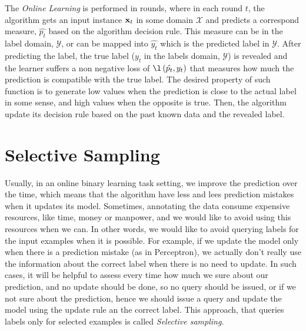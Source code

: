 %


The \textit{Online Learning} is performed in rounds, where in each round $t$, 
the algorithm gets an input instance $\mathbf{x}_{t}$ in some domain $\mathcal{X}$  and predicts a  correspond 
measure, $\hat{p_t}$ based on the algorithm decision rule. This measure can be in the label domain, 
$\mathcal{Y}$, or can be mapped into $\hat{y_t}$ which is the predicted label in $\mathcal{Y}$.   
After predicting the label, the true label ($y_t$ in the labels domain, $\mathcal{Y}$)  is revealed 
and the learner suffers a non negative loss of $\l\paren{\hat{p_t},y_t}$ that measures how much the 
prediction is compatible with the true label. The desired property of such function is to generate low 
values when the prediction is close to the actual label in some sense, and high values when the opposite 
is true. Then, the algorithm update its decision rule based on the past known data and the revealed label. 

\section{Selective Sampling}
\label{sec:selective_sampling}

Usually, in an  online binary learning task setting,  we improve the prediction over the time, 
which means that the algorithm  have less and lees prediction mistakes when it updates its model. 
Sometimes, annotating the data consume expensive resources, like time, money or manpower, 
and we would like to avoid using this resources when we can. In other words, we would like 
to avoid querying labels for the input examples when it is possible. For example, if we  update the 
model only when there is a prediction mistake (as in Perceptron), we actually don't really 
use the information about the correct label when there is no need to update. In such cases, 
it will be helpful to assess every time how much we sure about our prediction, and no update should be done, 
so no query should be issued, or if we not sure about the prediction, hence we should issue a 
query and update the model using the update rule an the correct label. 
This approach, that queries labels only for selected examples is called \textit{Selective sampling.}

